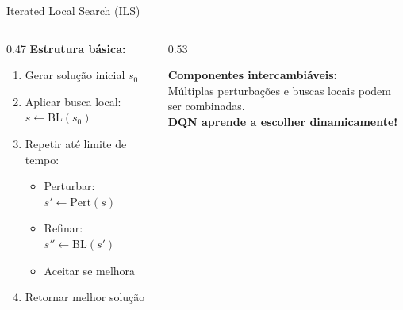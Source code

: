\documentclass[11pt, xcolor=dvipsnames]{beamer}
\newcommand{\destaque}[1]{\textbf{\textcolor{verde}{#1}}}
\begin{document}
\begin{frame}{Iterated Local Search (ILS)}
  \footnotesize
  \begin{columns}[T]
    \begin{column}{0.47\textwidth}
      \textbf{Estrutura básica:}
      \begin{enumerate}
        \item Gerar solução inicial $s_0$
        \item Aplicar busca local: $s \leftarrow \text{BL}(s_0)$
        \item Repetir até limite de tempo:
          \begin{itemize}
            \item Perturbar: $s' \leftarrow \text{Pert}(s)$
            \item Refinar: $s'' \leftarrow \text{BL}(s')$
            \item Aceitar se melhora
          \end{itemize}
        \item Retornar melhor solução
      \end{enumerate}
    \end{column}
    \begin{column}{0.53\textwidth}
      \begin{calloutbox}
        {\scriptsize
        \textbf{Componentes intercambiáveis:} \\[1mm]
        Múltiplas perturbações e buscas locais podem ser combinadas. \\[2mm]
        \destaque{DQN aprende a escolher dinamicamente!}
        }
      \end{calloutbox}
    \end{column}
  \end{columns}
\end{frame}
\end{document}

